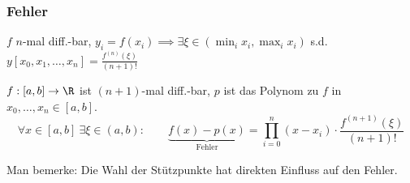 \subsubsection{Fehler}

\setcounter{all}{11}
\inlinetheorem $f$ $n$-mal diff.-bar, $y_i = f(x_i) \implies \exists \xi \in (\min_i x_i, \max_i x_i)$ s.d. $y[x_0,x_1,\ldots,x_n] = \frac{f^{(n)}(\xi)}{(n+1)!}$

 $f: [a,b] \to \R$ ist $(n+1)$-mal diff.-bar, $p$ ist das Polynom zu $f$ in $x_0,\ldots,x_n \in [a,b]$. 
$$
    \forall x \in [a,b]\ \exists \xi \in (a,b):\quad\quad \underbrace{f(x)-p(x)}_{\text{Fehler}} = \prod_{i=0}^{n}(x-x_i)\cdot\frac{f^{(n+1)}(\xi)}{(n+1)!}
$$

Man bemerke: Die Wahl der Stützpunkte hat direkten Einfluss auf den Fehler.


